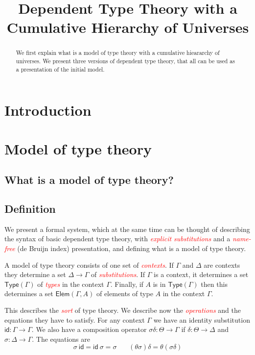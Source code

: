 \documentclass[11pt,a4paper]{article}
\theoremstyle{definition}
\newcommand{\Elem}{\mathsf{Elem}}
\newcommand{\Type}{\mathsf{Type}}
\newcommand{\id}{\mathsf{id}}
\newcommand{\EMP}[1]{\emph{\textcolor{red}{#1}}}
\begin{document}
\title{Dependent Type Theory with a Cumulative Hierarchy of Universes}

\author{}
\date{}
\maketitle

\begin{abstract}
  We first explain what is a model of type theory with a cumulative hieararchy of universes.
  We present three versions of dependent type theory, that all can be used as a presentation of the initial model.
\end{abstract}

\section{Introduction}\label{sec:intros}


\section{Model of type theory}

\subsection{What is a model of type theory?}

\subsection{Definition}

 We present a formal system, which at the same time can be thought of  describing  the
syntax of basic dependent type theory, with \EMP{explicit substitutions} and
a \EMP{name-free} (de Bruijn index) presentation, and defining what is a model
of type theory.

 A model of type theory consists of one set of \EMP{contexts}. If
$\Gamma$ and $\Delta$ are contexts they determine a set $\Delta\rightarrow\Gamma$
of \EMP{substitutions}. If $\Gamma$ is a context, it determines a set
$\Type(\Gamma)$ of \EMP{types} in the context $\Gamma$. Finally, if
$A$ is in $\Type(\Gamma)$ then this determines a set
$\Elem(\Gamma,A)$ of elements of type $A$ in the context $\Gamma$.

 This describes the \EMP{sort} of type theory. We describe now the \EMP{operations}
and the equations they have to satisfy. For any context $\Gamma$
we have an identity substitution $\id:\Gamma\rightarrow\Gamma$.
We also have a composition operator $\sigma\delta:\Theta\rightarrow\Gamma$ if
$\delta:\Theta\rightarrow\Delta$ and $\sigma:\Delta\rightarrow\Gamma$. 
The equations are
$$\sigma~ \id = \id~ \sigma = \sigma~~~~~~~~(\theta\sigma)\delta = \theta(\sigma\delta)$$
\end{document}
